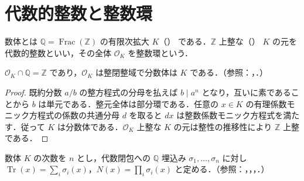 \section{代数的整数と整数環}
\begin{defn}[代数的整数と整数環]
数体とは $\mathbb Q=\operatorname{Frac}(\mathbb Z)$ の有限次拡大 $K$（） である．$\mathbb Z$ 上整な（） $K$ の元を代数的整数といい，その全体 $\mathcal O_K$ を整数環という．
\end{defn}
\begin{prop}[整数環の基本性質]
$\mathcal O_K\cap\mathbb Q=\mathbb Z$ であり，$\mathcal O_K$ は整閉整域で分数体は $K$ である．（参照：，．）
\end{prop}
\begin{proof}
既約分数 $a/b$ の整方程式の分母を払えば $b\mid a^n$ となり，互いに素であることから $b$ は単元である．整元全体は部分環である．任意の $x\in K$ の有理係数モニック方程式の係数の共通分母 $d$ を取ると $dx$ は整数係数モニック方程式を満たす．従って $K$ は分数体である．$\mathcal O_K$ 上整な $K$ の元は整性の推移性により $\mathbb Z$ 上整である．
\end{proof}
\begin{defn}[トレースとノルム]
数体 $K$ の次数を $n$ とし，代数閉包への $\mathbb Q$ 埋込み $\sigma_1,\ldots,\sigma_n$ に対し $\operatorname{Tr}(x)=\sum_i\sigma_i(x)$，$N(x)=\prod_i\sigma_i(x)$ と定める．（参照：，，，．）
\end{defn}

